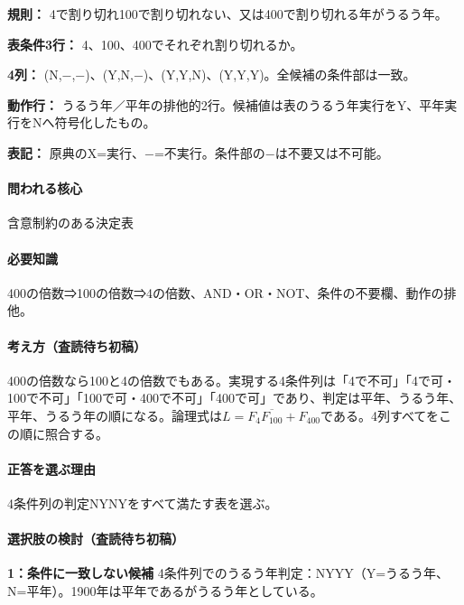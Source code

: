 \noindent\textbf{規則：} 4で割り切れ100で割り切れない、又は400で割り切れる年がうるう年。\par

\noindent\textbf{表条件3行：} 4、100、400でそれぞれ割り切れるか。\par

\noindent\textbf{4列：} (N,−,−)、(Y,N,−)、(Y,Y,N)、(Y,Y,Y)。全候補の条件部は一致。\par

\noindent\textbf{動作行：} うるう年／平年の排他的2行。候補値は表のうるう年実行をY、平年実行をNへ符号化したもの。\par

\noindent\textbf{表記：} 原典のX=実行、−=不実行。条件部の−は不要又は不可能。\par

\paragraph{問われる核心} 含意制約のある決定表

\paragraph{必要知識} 400の倍数⇒100の倍数⇒4の倍数、AND・OR・NOT、条件の不要欄、動作の排他。

\paragraph{考え方（査読待ち初稿）} 400の倍数なら100と4の倍数でもある。実現する4条件列は「4で不可」「4で可・100で不可」「100で可・400で不可」「400で可」であり、判定は平年、うるう年、平年、うるう年の順になる。論理式は\(L=F_4\overline{F_{100}}+F_{400}\)である。4列すべてをこの順に照合する。

\paragraph{正答を選ぶ理由} 4条件列の判定NYNYをすべて満たす表を選ぶ。

\paragraph{選択肢の検討（査読待ち初稿）}\mbox{}\par

\noindent\textbf{1：条件に一致しない候補} 4条件列でのうるう年判定：NYYY（Y=うるう年、N=平年）。1900年は平年であるがうるう年としている。\par

